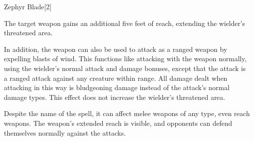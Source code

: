 \begin{spellsection}{Zephyr Blade}[2]
    \begin{spellheader}
    \end{spellheader}
    \begin{spellcontent}
        \begin{spelltargetinginfo}
        \end{spelltargetinginfo}
        \begin{spelleffects}
            \spelleffect The target weapon gains an additional five feet of reach, extending the wielder's threatened area.

            In addition, the weapon can also be used to attack as a ranged weapon by expelling blasts of wind. This functions like attacking with the weapon normally, using the wielder's normal attack and damage bonuses, except that the attack is a ranged attack against any creature within \rngclose range. All damage dealt when attacking in this way is bludgeoning damage instead of the attack's normal damage types. This effect does not increase the wielder's threatened area.
            \spelldur \durpersonallong
        \end{spelleffects}
    \end{spellcontent}
    \begin{spellfooter}
        \spellnotes Despite the name of the spell, it can affect melee weapons of any type, even reach weapons. The weapon's extended reach is visible, and opponents can defend themselves normally against the attacks.
        \miscastexplode
    \end{spellfooter}
    \begin{spellaugments}
    \end{spellaugments}
\end{spellsection}
